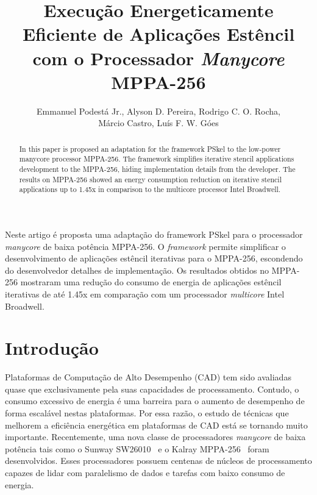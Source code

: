 \documentclass[12pt]{article}
\title{Execução Energeticamente Eficiente de Aplicações Estêncil com o Processador \textit{Manycore} MPPA-256}
\author{Emmanuel Podestá Jr.\inst{1}, Alyson D. Pereira\inst{1}, Rodrigo C. O. Rocha\inst{2},\\Márcio Castro\inst{1}, Luís F. W. Góes\inst{2}}
\newcommand{\fw}{\textit{framework}\xspace}
\newcommand{\mppa}{MPPA-256\xspace}
\begin{document}
\maketitle

\begin{abstract}
In this paper is proposed an adaptation for the framework PSkel to the low-power
manycore processor \mppa. The framework simplifies iterative stencil
applications development to the \mppa, hiding implementation details from the
developer. The results on \mppa showed an energy consumption reduction on
iterative stencil applications up to 1.45x in comparison to the multicore
processor Intel Broadwell.
\end{abstract}

\begin{resumo}
Neste artigo é proposta uma adaptação do framework PSkel para o processador
\textit{manycore} de baixa potência \mppa. O \fw permite simplificar o
desenvolvimento de aplicações estêncil iterativas para o \mppa, escondendo do
desenvolvedor detalhes de implementação. Os resultados obtidos no \mppa
mostraram uma redução do consumo de energia de aplicações estêncil iterativas de
até 1.45x em comparação com um processador \textit{multicore} Intel Broadwell.
\end{resumo}

\section{Introdução}

Plataformas de Computação de Alto Desempenho (CAD) tem sido avaliadas quase que
exclusivamente pela suas capacidades de processamento. Contudo, o consumo
excessivo de energia é uma barreira para o aumento de desempenho de forma
escalável nestas plataformas. Por essa razão, o estudo de técnicas que melhorem
a eficiência energética em plataformas de CAD está se tornando muito importante.
Recentemente, uma nova classe de processadores \textit{manycore} de baixa
potência tais como o Sunway SW26010~\cite{sunway:2016} e o Kalray
\mppa~\cite{Castro-IA3:2013} foram desenvolvidos. Esses processadores possuem
centenas de núcleos de processamento capazes de lidar com paralelismo de dados e
tarefas com baixo consumo de energia.
\end{document}

